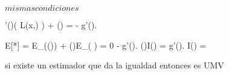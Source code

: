 \documentclass[../Main/main]{subfiles}
\begin{document}
{	
	{
		{
			$ mismas condiciones $
		}
		\holds
		{
			
		}
		\demonstration
		{
			\lambda'(\theta)\log( L(x,\theta) ) + \lambda(\theta) = - g'(\theta).

			E[*] = E_\theta(\lambda(\theta)) + \lambda(\theta)E_\theta( ) = 0 - g'(\theta).
			\lambda(\theta)I(\theta) = g'(\theta).
			I(\theta) = 
		}
	}
	
	
	
	
	
	
	si existe un estimador que da la igualdad entonces es UMV
	
	

	
}
\end{document}
